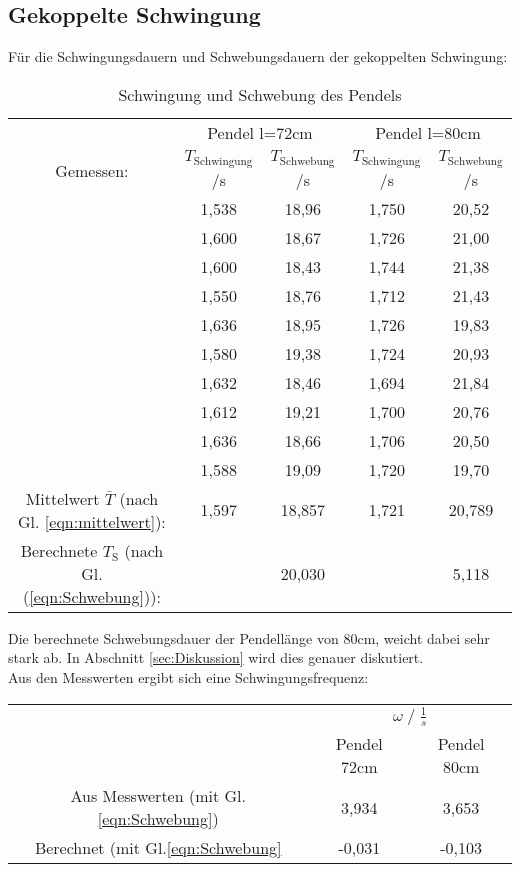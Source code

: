 \subsection{Gekoppelte Schwingung}
Für die Schwingungsdauern und Schwebungsdauern der gekoppelten Schwingung:
\begin{table}
    \centering
    \label{tab:Data_schw}
    \caption{Schwingung und Schwebung des Pendels}
    \begin{tabular}{c c | c || c | c}
        \toprule
        & \multicolumn{2}{c}{Pendel l=72cm} & \multicolumn{2}{c}{Pendel l=80cm} \\
        \cmidrule(lr){2-3}\cmidrule(lr){4-5}
        Gemessen: & $T_\text{Schwingung}$\;/\;s & $T_\text{Schwebung}$\;/\;s & $T_\text{Schwingung}$\;/\;s & $T_\text{Schwebung}$\;/\;s\\
        \midrule
        & 1,538 & 18,96 & 1,750 & 20,52 \\   
        & 1,600 & 18,67 & 1,726 & 21,00 \\
        & 1,600 & 18,43 & 1,744 & 21,38 \\
        & 1,550 & 18,76 & 1,712 & 21,43 \\
        & 1,636 & 18,95 & 1,726 & 19,83 \\
        & 1,580 & 19,38 & 1,724 & 20,93 \\
        & 1,632 & 18,46 & 1,694 & 21,84 \\
        & 1,612 & 19,21 & 1,700 & 20,76 \\
        & 1,636 & 18,66 & 1,706 & 20,50 \\
        & 1,588 & 19,09 & 1,720 & 19,70 \\
        \midrule
        Mittelwert $\bar{T}$ (nach Gl. \ref{eqn:mittelwert}): & 1,597 & 18,857 & 1,721 & 20,789 \\
        Berechnete $T_\textrm{S}$ (nach Gl.(\ref{eqn:Schwebung})):  &       & 20,030 &       &  5,118 \\
        \bottomrule
    \end{tabular}
\end{table}
Die berechnete Schwebungsdauer der Pendellänge von 80cm, weicht dabei sehr stark ab. In Abschnitt \ref{sec:Diskussion} wird dies genauer diskutiert.\\

Aus den Messwerten ergibt sich eine Schwingungsfrequenz:
\begin{table}
    \centering
    \label{tab:frq_gleichs}
    \begin{tabular}{c c c}
        \toprule
        & \multicolumn{2}{c}{$\omega\;/\;\frac{1}{s}$}\\
        \cmidrule(lr){2-3} 
        & Pendel 72cm & Pendel 80cm\\
        \midrule
        Aus Messwerten (mit Gl.\ref{eqn:Schwebung}) & 3,934 & 3,653 \\
        Berechnet (mit Gl.\ref{eqn:Schwebung}      & -0,031 & -0,103 \\
        \bottomrule
    \end{tabular}
\end{table}

